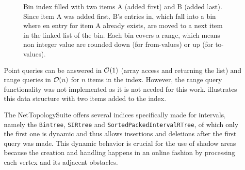 \begin{figure}[h]
\begin{figcenter}
			\end{figcenter}
			\caption{Bin index filled with two items A (added first) and B (added last). Since item A was added first, B's entries in, which fall into a bin where en entry for item A already exists, are moved to a next item in the linked list of the bin. Each bin covers a range, which means non integer value are rounded down (for from-values) or up (for to-values).}
			\label{fig:bin-index}
		\end{figure}
		
		Point queries can be answered in $\mathcal{O}(1)$ (array access and returning the list) and range queries in $\mathcal{O}(n)$ for $n$ items in the index.
		However, the range query functionality was not implemented as it is not needed for this work.
		 illustrates this data structure with two items added to the index.
		
		The NetTopologySuite offers several indices specifically made for intervals, namely the \texttt{Bintree}, \texttt{SIRtree} and \texttt{SortedPackedIntervalRTree}, of which only the first one is dynamic and thus allows insertions and deletions after the first query was made.
		This dynamic behavior is crucial for the use of shadow areas because the creation and handling happens in an online fashion by processing each vertex and its adjacent obstacles.
		
